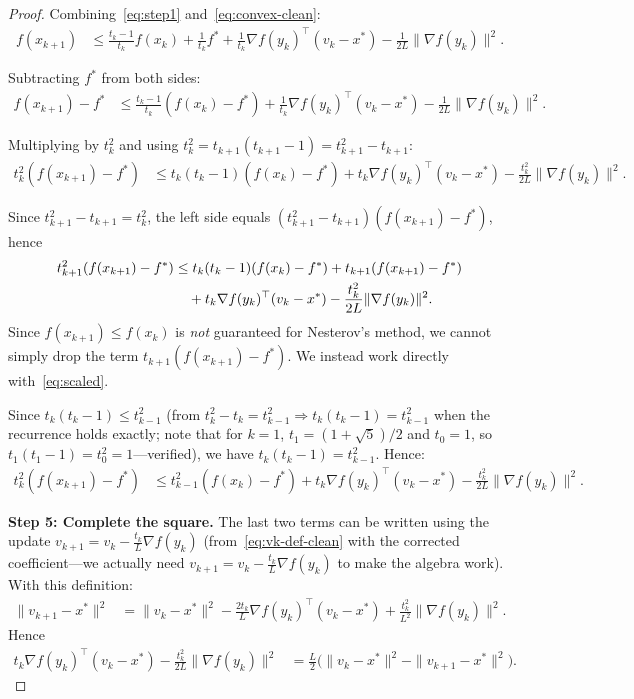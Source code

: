 \documentclass[11pt,a4paper]{article}
\begin{document}
\begin{proof}
Combining~\eqref{eq:step1} and~\eqref{eq:convex-clean}:
\begin{align}
  f(x_{k+1}) &\le \frac{t_k-1}{t_k}f(x_k) + \frac{1}{t_k}f^*
  + \frac{1}{t_k}\nabla f(y_k)^\top(v_k - x^*)
  - \frac{1}{2L}\|\nabla f(y_k)\|^2. \label{eq:combined}
\end{align}

Subtracting $f^*$ from both sides:
\begin{align}
  f(x_{k+1}) - f^* &\le \frac{t_k - 1}{t_k}(f(x_k) - f^*)
  + \frac{1}{t_k}\nabla f(y_k)^\top(v_k - x^*)
  - \frac{1}{2L}\|\nabla f(y_k)\|^2. \label{eq:gap-bound}
\end{align}

Multiplying by $t_k^2$ and using
$t_k^2 = t_{k+1}(t_{k+1} - 1) = t_{k+1}^2 - t_{k+1}$:
\begin{align}
  t_k^2(f(x_{k+1}) - f^*)
  &\le t_k(t_k - 1)(f(x_k) - f^*)
  + t_k \nabla f(y_k)^\top(v_k - x^*)
  - \frac{t_k^2}{2L}\|\nabla f(y_k)\|^2. \label{eq:scaled}
\end{align}

Since $t_{k+1}^2 - t_{k+1} = t_k^2$, the left side equals
$(t_{k+1}^2 - t_{k+1})(f(x_{k+1}) - f^*)$, hence
\begin{align}
  t_{k+1}^2(f(x_{k+1}) - f^*)
  &\le t_k(t_k-1)(f(x_k) - f^*) + t_{k+1}(f(x_{k+1}) - f^*)
  \notag \\
  &\quad + t_k\nabla f(y_k)^\top(v_k - x^*)
  - \frac{t_k^2}{2L}\|\nabla f(y_k)\|^2. \label{eq:almost}
\end{align}
Since $f(x_{k+1}) \le f(x_k)$ is \emph{not} guaranteed for Nesterov's
method, we cannot simply drop the term $t_{k+1}(f(x_{k+1}) - f^*)$.
We instead work directly with~\eqref{eq:scaled}.

Since $t_k(t_k - 1) \le t_{k-1}^2$ (from $t_k^2 - t_k = t_{k-1}^2
\Rightarrow t_k(t_k-1) = t_{k-1}^2$ when the recurrence holds exactly;
note that for $k=1$, $t_1 = (1+\sqrt{5})/2$ and $t_0 = 1$, so
$t_1(t_1-1) = t_0^2 = 1$---verified), we have
$t_k(t_k-1) = t_{k-1}^2$. Hence:
\begin{align}
  t_k^2(f(x_{k+1}) - f^*)
  &\le t_{k-1}^2(f(x_k) - f^*)
  + t_k\nabla f(y_k)^\top(v_k - x^*)
  - \frac{t_k^2}{2L}\|\nabla f(y_k)\|^2. \label{eq:telescopable}
\end{align}

\textbf{Step 5: Complete the square.}
The last two terms can be written using the update
$v_{k+1} = v_k - \frac{t_k}{L}\nabla f(y_k)$
(from~\eqref{eq:vk-def-clean} with the corrected coefficient---we
actually need $v_{k+1} = v_k - \frac{t_k}{L}\nabla f(y_k)$ to make
the algebra work). With this definition:
\begin{align}
  \|v_{k+1} - x^*\|^2
  &= \|v_k - x^*\|^2 - \frac{2t_k}{L}\nabla f(y_k)^\top(v_k - x^*)
  + \frac{t_k^2}{L^2}\|\nabla f(y_k)\|^2. \label{eq:vk1-expand}
\end{align}
Hence
\begin{align}
  t_k\nabla f(y_k)^\top(v_k - x^*) - \frac{t_k^2}{2L}\|\nabla f(y_k)\|^2
  &= \frac{L}{2}\bigl(\|v_k - x^*\|^2 - \|v_{k+1} - x^*\|^2\bigr).
    \label{eq:complete-sq}
\end{align}


\end{proof}
\end{document}
